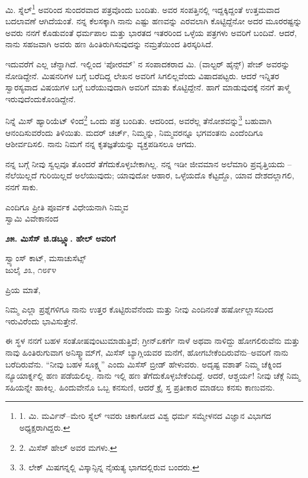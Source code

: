 ಮಿ. ಸ್ನೆಲ್\footnote{1. ಮಿ. ಮರ್ವಿನ್–ಮೇರಿ ಸ್ನೆಲ್ ಇವರು ಚಿಕಾಗೋದ ವಿಶ್ವ ಧರ್ಮ ಸಮ್ಮೇಳನದ ವಿಜ್ಞಾನ ವಿಭಾಗದ ಅಧ್ಯಕ್ಷರಾಗಿದ್ದರು.} ಅವರಿಂದ ಸುಂದರವಾದ ಪತ್ರವೊಂದು ಬಂದಿತು. ಅವರ ಸಂಪತ್ತಿನಲ್ಲಿ ಇದ್ದಕ್ಕಿದ್ದಂತೆ ಉತ್ತಮವಾದ ಬದಲಾವಣೆ ಆಗಿದೆಯಂತೆ. ನನ್ನ ಕೆಲಸಕ್ಕಾಗಿ ನಾನು ಎಷ್ಟು ಹಣವನ್ನು ಎರವಲಾಗಿ ಕೊಟ್ಟಿದ್ದೆನೋ ಅದರ ಮೂರರಷ್ಟನ್ನು ಅವರು ನನಗೆ ಕೊಡುವಂತೆ ಧರ್ಮಪಾಲ ಮತ್ತು ಭಾರತದ ಇತರರಿಂದ ಒಳ್ಳೆಯ ಪತ್ರಗಳು ಅವರಿಗೆ ಬಂದಿವೆ. ಆದರೆ, ನಾನು ಸಹಜವಾಗಿ ಅವರು ಹಣ ಹಿಂತಿರುಗಿಸುವುದನ್ನು ನಮ್ರತೆಯಿಂದ ತಿರಸ್ಕರಿಸಿದೆ.

ಇದುವರೆಗೆ ಎಲ್ಲ ಚೆನ್ನಾಗಿದೆ. ಇಲ್ಲಿಂದ ‘ಪೋರಮ್​’ ನ ಸಂಪಾದಕರಾದ ಮಿ. (ವಾಲ್ಟರ್ ಹೈನ್ಸ್) ಪೇಜ್ ಅವರನ್ನು ನೋಡಿದ್ದೇನೆ. ಮಿಷನರಿಗಳ ಬಗ್ಗೆ ಬರೆದಿದ್ದ ಲೇಖನ ಅವರಿಗೆ ಸಿಗಲಿಲ್ಲವೆಂದು ವಿಷಾದಪಟ್ಟರು. ಆದರೆ ಇನ್ನಿತರ ಸ್ವಾರಸ್ಯವಾದ ವಿಷಯಗಳ ಬಗ್ಗೆ ಬರೆಯುವುದಾಗಿ ಅವರಿಗೆ ಮಾತು ಕೊಟ್ಟಿದ್ದೇನೆ. ಹಾಗೆ ಮಾಡುವುದಕ್ಕೆ ನನಗೆ ತಾಳ್ಮೆ ಇರುವುದೆಂದುಕೊಂಡಿದ್ದೇನೆ.

ನಿನ್ನೆ ಮಿಸ್ ಹ್ಯಾರಿಯೆಟ್ ಳಿಂದ\footnote{2. ಮಿಸೆಸ್ ಹೇಲ್ ಅವರ ಮಗಳು.} ಒಂದು ಪತ್ರ ಬಂದಿತು. ಆದರಿಂದ, ಅವರೆಲ್ಲ ತೆನೋಶವನ್ನು\footnote{3. ಲೇಕ್ ಮಿಷಗನ್ನಲ್ಲಿ ವಿಸ್ಕಾನ್ಸಿನ್ನ ನೈಋತ್ಯ ಭಾಗದಲ್ಲಿರುವ ಬಂದರು.} ಬಹುವಾಗಿ ಆನಂದಿಸುವರೆಂದು ತಿಳಿಯಿತು. ಮದರ್ ಚರ್ಚ್, ನಿಮ್ಮನ್ನು, ನಿಮ್ಮವರನ್ನೂ ಭಗವಂತನು ಎಂದೆಂದಿಗೂ ಆಶೀರ್ವದಿಸಲಿ. ನಾನು ನಿಮಗೆ ನನ್ನ ಕೃತಜ್ಞತೆಯನ್ನು ವ್ಯಕ್ತಪಡಿಸಲೂ ಆಗದು.

ನನ್ನ ಬಗ್ಗೆ ನೀವು ಸ್ವಲ್ಪವೂ ತೊಂದರೆ ತೆಗೆದುಕೊಳ್ಳಬೇಕಾಗಿಲ್ಲ. ನನ್ನ ಇಡೀ ಜೀವಮಾನ ಅಲೆಮಾರಿ ಪ್ರವೃತ್ತಿಯದು – ನೆಲೆಯಿಲ್ಲದೆ ಗುರಿಯಿಲ್ಲದೆ ಅಲೆಯುವುದು; ಯಾವುದೋ ಆಹಾರ, ಒಳ್ಳೆಯದೊ ಕೆಟ್ಟದ್ದೊ, ಯಾವ ದೇಶದಲ್ಲಾಗಲಿ, ನನಗೆ ಸಾಕು.

\begin{flushright}
ಎಂದಿಗೂ ಪ್ರೀತಿ ಪೂರ್ವಕ ವಿಧೇಯನಾಗಿ ನಿಮ್ಮವ\\ಸ್ವಾಮಿ ವಿವೇಕಾನಂದ
\end{flushright}

\begin{center}
\textbf{೨೫. ಮಿಸೆಸ್ ಜಿ.ಡಬ್ಲ್ಯೂ. ಹೇಲ್ ಅವರಿಗೆ}
\end{center}

\begin{flushright}
ಸ್ವ್ಯಾಂಸ್ ಕಾಟ್, ಮಸಾಚುಸೆಟ್ಸ್\\ಜುಲೈ ೨೩, ೧೮೯೪
\end{flushright}

ಪ್ರಿಯ ಮಾತೆ,

ನಿಮ್ಮ ಎಲ್ಲಾ ಪ್ರಶ್ನೆಗಳಿಗೂ ನಾನು ಉತ್ತರ ಕೊಟ್ಟಿರುವೆನೆಂದು ಮತ್ತು ನೀವು ಎಂದಿನಂತೆ ಹರ್ಷೋಲ್ಲಾಸದಿಂದ ಇರುವಿರೆಂದು ಭಾವಿಸುತ್ತೇನೆ.

ಈ ಸ್ಥಳ ನನಗೆ ಬಹಳ ಸಂತೋಷವುಂಟುಮಾಡುತ್ತಿದೆ; ಗ್ರೀನ್ಏಕರ್ಗೆ ನಾಳೆ ಅಥವಾ ನಾಳಿದ್ದು ಹೋಗಲಿರುವೆನು ಮತ್ತು ನಾವು ಹಿಂತಿರುಗುವಾಗ ಅನಿಸ್ಕ್ವಾಮ್​ಗೆ, ಮಿಸೆಸ್ ಬ್ಯಾಗ್ಲಿಯವರ ಮನೆಗೆ, ಹೋಗಬೇಕೆಂದಿರುವೆನು–ಅವರಿಗೆ ನಾನು ಬರೆದಿರುವೆನು. “ನೀವು ಬಹಳ ಸೂಕ್ಷ್ಮ” ಎಂದು ಮಿಸೆಸ್ ಬ್ರೀಡ್ ಹೇಳುವರು. ಅದೃಷ್ಟ ವಶಾತ್ ನಿಮ್ಮ ಚೆಕ್ನಿಂದ ನ್ಯೂಯಾರ್ಕ್ನಲ್ಲಿ ಹಣ ಪಡೆಯಲಿಲ್ಲ. ನಾನು ಇಲ್ಲಿ ಹಣ ತೆಗೆದುಕೊಳ್ಳಬೇಕೆಂದಿದ್ದೆ. ಆದರೆ, ಆಶ್ಚರ್ಯ! ನೀವು ಚೆಕ್ಗೆ ನಿಮ್ಮ ಸಹಿಯನ್ನೇ ಹಾಕಿಲ್ಲ. ಹಿಂದುವೇನೊ ಒಬ್ಬ ಕನಸುಣಿ, ಆದರೆ ಕ್ರೈ ಸ್ತ ಪ್ರತೀಕಾರ ಮಾಡಲು ಕನಸು ಕಾಣುವನು.

